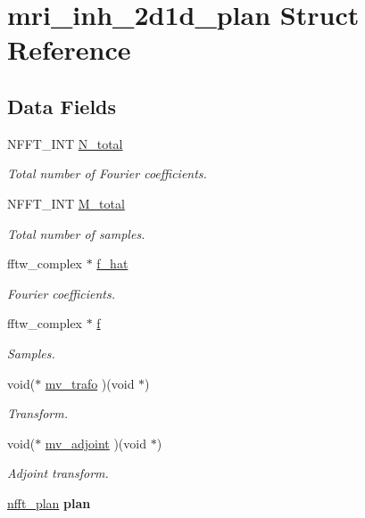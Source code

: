 \hypertarget{structmri__inh__2d1d__plan}{\section{mri\-\_\-inh\-\_\-2d1d\-\_\-plan Struct Reference}
\label{structmri__inh__2d1d__plan}
}
\subsection*{Data Fields}
\begin{DoxyCompactItemize}
\item 
N\-F\-F\-T\-\_\-\-I\-N\-T \hyperlink{structmri__inh__2d1d__plan_a05e40914ac74d6cececb2a7c76cd735e}{N\-\_\-total}
\begin{DoxyCompactList}\small\item\em Total number of Fourier coefficients. \end{DoxyCompactList}\item 
N\-F\-F\-T\-\_\-\-I\-N\-T \hyperlink{structmri__inh__2d1d__plan_a1616401cb04fe10b117cdba7fc4c1c7b}{M\-\_\-total}
\begin{DoxyCompactList}\small\item\em Total number of samples. \end{DoxyCompactList}\item 
fftw\-\_\-complex $\ast$ \hyperlink{structmri__inh__2d1d__plan_ad34c95b6390628c8fcd223b77e37e5bf}{f\-\_\-hat}
\begin{DoxyCompactList}\small\item\em Fourier coefficients. \end{DoxyCompactList}\item 
fftw\-\_\-complex $\ast$ \hyperlink{structmri__inh__2d1d__plan_a985f125ad6a94361939572f8323872a0}{f}
\begin{DoxyCompactList}\small\item\em Samples. \end{DoxyCompactList}\item 
void($\ast$ \hyperlink{structmri__inh__2d1d__plan_a4cad33b38f4d5bc54b8d25d90913ab44}{mv\-\_\-trafo} )(void $\ast$)
\begin{DoxyCompactList}\small\item\em Transform. \end{DoxyCompactList}\item 
void($\ast$ \hyperlink{structmri__inh__2d1d__plan_afe427225384a2d226c3cb85cf9aa4042}{mv\-\_\-adjoint} )(void $\ast$)
\begin{DoxyCompactList}\small\item\em Adjoint transform. \end{DoxyCompactList}\item 
\hypertarget{structmri__inh__2d1d__plan_ac911bea7fd2e5b81f3f7a917842d6bc7}{\hyperlink{structnfft__plan}{nfft\-\_\-plan} {\bfseries plan}}\label{structmri__inh__2d1d__plan_ac911bea7fd2e5b81f3f7a917842d6bc7}


\end{DoxyCompactItemize}
